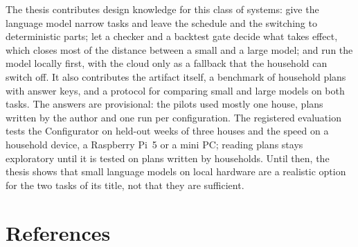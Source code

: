 The thesis contributes design knowledge for this class of systems:
give the language model narrow tasks and leave the schedule and the
switching to deterministic parts; let a checker and a backtest gate
decide what takes effect, which closes most of the distance between a
small and a large model; and run the model locally first, with the
cloud only as a fallback that the household can switch off. It also
contributes the artifact itself, a benchmark of household plans with
answer keys, and a protocol for comparing small and large models on
both tasks. The answers are provisional: the pilots used mostly one house,
plans written by the author and one run per configuration. The
registered evaluation tests the Configurator on held-out weeks of three
houses and the speed on a household device, a Raspberry Pi~5 or a mini
PC; reading plans stays exploratory until it is tested on plans written
by households. Until then, the thesis shows that small language models on local hardware are
a realistic option for the two tasks of its title, not that they are
sufficient.

\chapter*{References}

